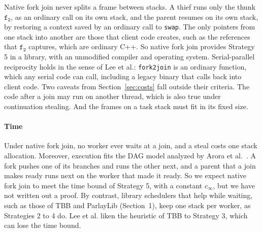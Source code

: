 \documentclass[sigplan,nonacm]{acmart}
\newcommand{\ft}{\mathtt{f_2}}
\begin{document}
Native fork join never splits a frame between stacks.
%
A thief runs only the thunk $\ft$, as an ordinary call on its own
stack, and the parent resumes on its own stack, by restoring a context
saved by an ordinary call to \lstinline|swap|.
%
The only pointers from one stack into another are those that client
code creates, such as the references that $\ft$ captures, which are
ordinary C++.
%
So native fork join provides Strategy 5 in a library, with an
unmodified compiler and operating system.
%
Serial-parallel reciprocity holds in the sense of Lee et al.:
\lstinline|fork2join| is an ordinary function, which any serial code
can call, including a legacy binary that calls back into client code.
%
Two caveats from Section~\ref{sec:costs} fall outside their criteria.
%
The code after a join may run on another thread, which is also true
under continuation stealing.
%
And the frames on a task stack must fit in its fixed size.

\paragraph{Time}
%
Under native fork join, no worker ever waits at a join, and a steal
costs one stack allocation.
%
Moreover, execution fits the DAG model analyzed by Arora et
al.~\cite{arora98}.
%
A fork pushes one of its branches and runs the other next, and a
parent that a join makes ready runs next on the worker that made it
ready.
%
So we expect native fork join to meet the time bound of Strategy 5,
with a constant $c_\infty$, but we have not written out a proof.
%
By contrast, library schedulers that help while waiting, such as those
of TBB and ParlayLib (Section~1), keep one stack per worker, as
Strategies 2 to 4 do.
%
Lee et al. liken the heuristic of TBB to Strategy 3, which can lose the
time bound.
\end{document}
